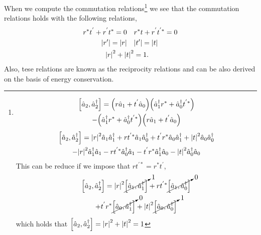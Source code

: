 \documentclass[a4paper]{tufte-handout} %
\newcommand{\hata}{\hat{a}}
\newcommand{\hatad}{\hat{a}^\dagger}
\begin{document}
When we compute the commutation relations\footnote{
\begin{multline*}
 \commutator{\hata_2}{\hatad_2} =  \qty(r\hata_1 + t^{'} \hata_0)\qty(\hatad_1 r^* + \hatad_0 t^{'*}) \\- \qty(\hatad_1 r^* + \hatad_0 t^{'*})\qty(r\hata_1 + t^{'} \hata_0)
\end{multline*}
\begin{multline*}
 \commutator{\hata_2}{\hatad_2}  = \abs{r}^2\hata_1\hatad_1 + rt^{'*}\hata_1\hatad_0 + t^{'}r^*\hata_0\hatad_1 + \abs{t}^2\hata_0\hatad_0 
                                        \\-\abs{r}^2\hatad_1\hata_1 - rt^{'*}\hatad_0\hata_1 - t^{'}r^*\hatad_1\hata_0 - \abs{t}^2\hatad_0\hata_0 
\end{multline*}
This can be reduce if we impose that $rt^{'*}=r^*t^{'}$,
\begin{multline*}
    \commutator{\hata_2}{\hatad_2} = \abs{r}^2\cancelto{1}{\commutator{\hata_1}{\hatad_1}} + rt^{'*}\cancelto{0}{\commutator{\hata_1}{\hatad_0}} \\
    + t^{'}r^*\cancelto{0}{\commutator{\hata_0}{\hatad_1}} + \abs{t}^2\cancelto{1}{\commutator{\hata_0}{\hatad_0}}
\end{multline*}
which holds that $\commutator{\hata_2}{\hatad_2} = \abs{r}^2 + \abs{t}^2 = 1$
}
we see that the commutation relations holds with the following relations,
\begin{align*}
    r^*t^{'} + r^{'}t^* = 0 \quad& r^*t + r^{'}t^{'*} = 0 \\
    \abs{r'} = \abs{r} \quad& \abs{t'} = \abs{t} \\ 
    \abs{r}^2 + \abs{t}^2 &= 1.
\end{align*}
Also, tese relations are known as the reciprocity relations and can be also derived on the basis of energy conservation.
\end{document}

